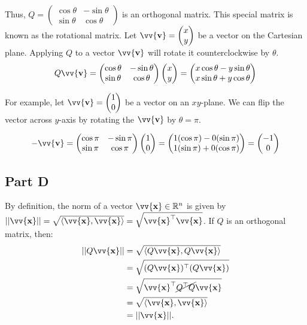 \documentclass[12pt]{article}
\newcommand{\vect}[1]{\vv{\mathbf{#1}}}
\newcommand{\R}{\mathbb{R}}
\begin{document}
Thus, $Q = \begin{pmatrix}
    \cos\theta & -\sin\theta \\
    \sin\theta & \cos\theta
\end{pmatrix}$ is an orthogonal matrix. This special matrix is known as the rotational matrix. Let $\vect{v}=\begin{pmatrix}
    x \\ y
\end{pmatrix}$ be a vector on the Cartesian plane. Applying $Q$ to a vector $\vect{v}$ will rotate it counterclockwise by $\theta$.
$$
Q\vect{v} = \begin{pmatrix}
    \cos\theta & -\sin\theta \\
    \sin\theta & \cos\theta
\end{pmatrix}
\begin{pmatrix}
    x \\ y
\end{pmatrix}
= \begin{pmatrix}
    x\cos\theta - y\sin\theta \\
    x\sin\theta + y\cos\theta
\end{pmatrix}
$$

For example, let $\vect{v}=\begin{pmatrix}
    1 \\ 0
\end{pmatrix}$ be a vector on an $xy$-plane. We can flip the vector across $y$-axis by rotating the $\vect{v}$ by $\theta=\pi$.

$$
-\vect{v}
= \begin{pmatrix}
    \cos\pi & -\sin\pi \\
    \sin\pi & \cos\pi
\end{pmatrix}
\begin{pmatrix}
    1 \\ 0
\end{pmatrix}
= \begin{pmatrix}
    1(\cos\pi) - 0(\sin\pi) \\
    1(\sin\pi) + 0(\cos\pi)
\end{pmatrix}
= \begin{pmatrix}
    -1 \\ 0
\end{pmatrix}
$$

\subsection*{Part D}

By definition, the norm of a vector $\vect{x}\in\R^n$ is given by $||\vect{x}|| = \sqrt{\langle\vect{x},\vect{x}\rangle} = \sqrt{\vect{x}^\top \vect{x}}$. If $Q$ is an orthogonal matrix, then:
\begin{align*}
    ||Q\vect{x}|| &= \sqrt{\langle Q\vect{x}, Q\vect{x}\rangle} \\
    &= \sqrt{(Q\vect{x})^\top (Q\vect{x})} \\
    &= \sqrt{\vect{x}^\top \cancel{Q^\top Q}\vect{x}} \\
    &= \sqrt{\langle\vect{x},\vect{x}\rangle} \\
    &= ||\vect{x}||.
\end{align*}
\end{document}
